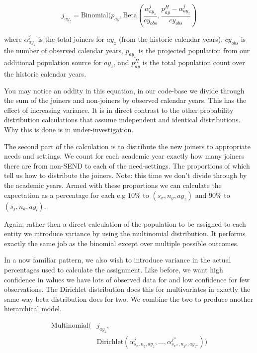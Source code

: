 \documentclass[margin=5mm]{article}
\begin{document}
\begin{equation*}
j_{ay_z} = \text{Binomial}(p_{ay},
\text{Beta}(\frac{\alpha^j_{ay_z}}{cy_{obs}},\frac{p^{H}_{ay} -\alpha^j_{ay_z}}{cy_{obs}})
\end{equation*}

where $\alpha^j_{ay_z}$ is the total joiners for $ay_z$ (from the
historic calendar years), $cy_{obs}$ is the number of observed
calendar years, $p_{ay_z}$ is the projected population from our
additional population source for $ay_z$, and $p^{H}_{ay}$ is the total
population count over the historic calendar years.

You may notice an oddity in this equation, in our code-base we divide
through the sum of the joiners and non-joiners by observed calendar
years.  This has the effect of increasing variance.  It is in direct
contrast to the other probability distribution calculations that
assume independent and identical distributions.  Why this is done is
in under-investigation.

The second part of the calculation is to distribute the new joiners to
appropriate needs and settings.  We count for each academic year
exactly how many joiners there are from non-SEND to each of the
need-settings.  The proportions of which tell us how to distribute the
joiners.  Note: this time we don't divide through by the academic
years.  Armed with these proportions we can calculate the expectation
as a percentage for each e.g $10\%$ to $(s_x,n_y,ay_z)$ and $90\%$ to
$(s_j,n_k,ay_l)$.

Again, rather then a direct calculation of the population to be
assigned to each entity we introduce variance by using the multinomial
distribution.  It performs exactly the same job as the binomial except
over multiple possible outcomes.

In a now familiar pattern, we also wish to introduce variance in the
actual percentages used to calculate the assignment.  Like before, we
want high confidence in values we have lots of observed data for and
low confidence for few observations.  The Dirichlet distribution does
this for multivariates in exactly the same way beta distribution does
for two.  We combine the two to produce another hierarchical model.

\begin{equation*}
\begin{split}
  \text{Multinomial} ( & j_{ay_{z}}, \\
  & \text{Dirichlet} (\alpha^{j}_{s_x,n_y,ay_z}, \dots,
  \alpha^{j''}_{s_{x'''},n_{y''},ay_{z''}}))
\end{split}
\end{equation*}
\end{document}
